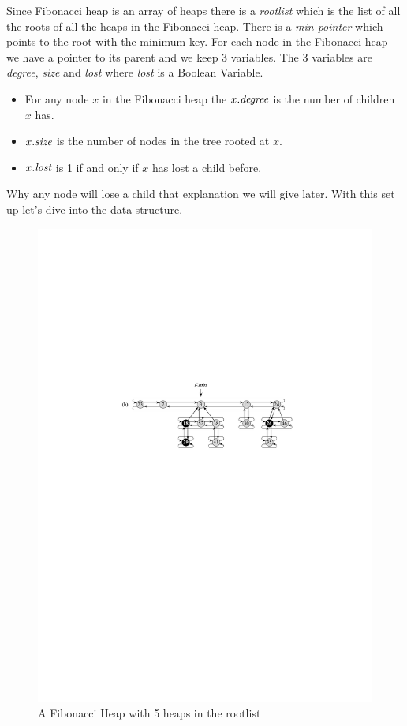 Since Fibonacci heap is an array of heaps there is a \emph{rootlist} which is the list of all the roots of all the heaps in the Fibonacci heap. There is a \emph{min-pointer} which points to the root with the minimum key. For each node in the Fibonacci heap we have a pointer to its parent and  we keep 3 variables. The 3 variables are \emph{degree}, \emph{size} and \emph{lost} where \emph{lost} is a Boolean Variable. \begin{itemize}
	\item For any node $x$ in the Fibonacci heap the $x.\emph{degree}$ is the number of children $x$ has.
	\item $x.\emph{size}$ is the number of nodes in the tree rooted at $x$.
	\item $x.\emph{lost}$ is 1 if and only if $x$ has lost a child before.
\end{itemize} Why any node will lose a child that explanation we will give later. With this set up let's dive into the data structure.

\begin{figure}[h!]
	\centering
	\includegraphics{images/Fibheap1.pdf}
	\caption{A Fibonacci Heap with 5 heaps in the rootlist}
\end{figure}
